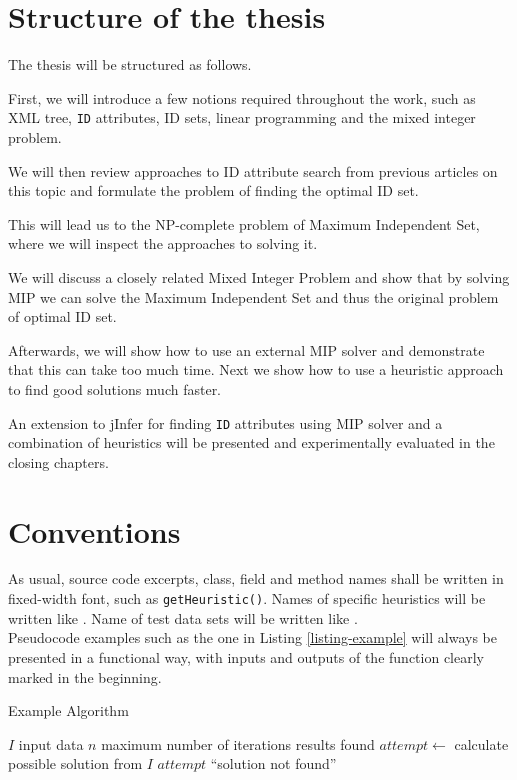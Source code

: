 \section{Structure of the thesis}

The thesis will be structured as follows.

First, we will introduce a few notions required throughout the work, such as XML tree, \texttt{ID} attributes, ID sets, linear programming and the mixed integer problem.

We will then review approaches to ID attribute search from previous articles on this topic and formulate the problem of finding the optimal ID set.

This will lead us to the NP-complete problem of Maximum Independent Set, where we will inspect the approaches to solving it.

We will discuss a closely related Mixed Integer Problem and show that by solving MIP we can solve the Maximum Independent Set and thus the original problem of optimal ID set.

Afterwards, we will show how to use an external MIP solver and demonstrate that this can take too much time. Next we show how to use a heuristic approach to find good solutions much faster.

An extension to jInfer for finding \texttt{ID} attributes using MIP solver and a combination of heuristics will be presented and experimentally evaluated in the closing chapters.

\section{Conventions}

As usual, source code excerpts, class, field and method names shall be written in fixed-width font, such as \texttt{get\-Heu\-ris\-tic()}. Names of specific heuristics will be written like . Name of test data sets will be written like .\\

Pseudocode examples such as the one in Listing \ref{listing-example} will always be presented in a functional way, with inputs and outputs of the function clearly marked in the beginning.

\begin{algorithm}
\caption{Example Algorithm}
\label{listing-example}
\begin{algorithmic}
\REQUIRE $I$ input data
\REQUIRE $n$ maximum number of iterations
\ENSURE results found
  \STATE {}
  \STATE $attempt \gets $ calculate possible solution from $I$
    \RETURN $attempt$
  \ENDIF
  \RETURN ``solution not found''
\ENDFOR
\end{algorithmic}
\end{algorithm}

